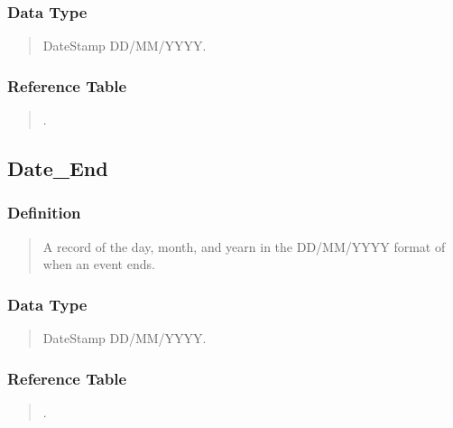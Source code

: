 \documentclass[letterpaper,10pt,english]{sphinxmanual}
\begin{document}
\subsubsection{Data Type}
\label{\detokenize{database_schema:id41}}\begin{quote}

\sphinxAtStartPar
DateStamp DD/MM/YYYY.
\end{quote}


\subsubsection{Reference Table}
\label{\detokenize{database_schema:id42}}\begin{quote}

\sphinxAtStartPar
{\hyperref[\detokenize{database_schema:overview-table}]{}}.
\end{quote}


\subsection{Date\_End}
\label{\detokenize{database_schema:date-end}}

\subsubsection{Definition}
\label{\detokenize{database_schema:id43}}\begin{quote}

\sphinxAtStartPar
A record of the day, month, and yearn in the DD/MM/YYYY format of when an event ends.
\end{quote}


\subsubsection{Data Type}
\label{\detokenize{database_schema:id44}}\begin{quote}

\sphinxAtStartPar
DateStamp DD/MM/YYYY.
\end{quote}


\subsubsection{Reference Table}
\label{\detokenize{database_schema:id45}}\begin{quote}

\sphinxAtStartPar
{\hyperref[\detokenize{database_schema:overview-table}]{}}.
\end{quote}
\end{document}
